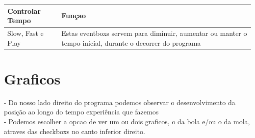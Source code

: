 \documentclass[defaultstyle,12pt]{report}
\begin{document}
  \begin{center}
    \begin{tabular}{ | l | p{5cm} |}
    \hline
    Controlar Tempo & Funçao \\ \hline
    Slow, Fast e Play & Estas eventboxs servem para diminuir, aumentar ou manter o tempo inicial, durante o decorrer do programa \\\hline
  
    \end{tabular}
   
\end{center}
    
    \pagebreak

\section{Graficos}
  
- Do nosso lado direito do programa podemos observar o desenvolvimento da posição ao longo do tempo experiência que fazemos\\

- Podemos escolher a opcao de ver um ou dois graficos, o da bola e/ou o da mola, atraves das checkboxs no canto inferior direito. 
\\\\\\\
\end{document}
